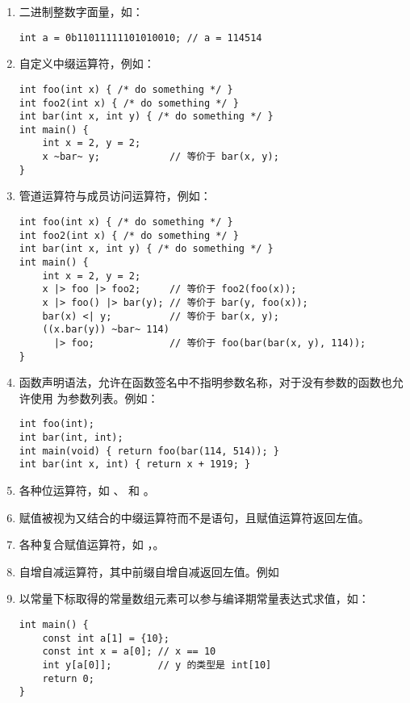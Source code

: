 \begin{enumerate}
    \item 二进制整数字面量，如：
    \begin{verbatim}
int a = 0b11011111101010010; // a = 114514
    \end{verbatim}
    \item 自定义中缀运算符，例如：
    \begin{verbatim}
int foo(int x) { /* do something */ }
int foo2(int x) { /* do something */ }
int bar(int x, int y) { /* do something */ }
int main() {
    int x = 2, y = 2;
    x ~bar~ y;            // 等价于 bar(x, y);
}
    \end{verbatim}
    \item 管道运算符与成员访问运算符，例如：
    \begin{verbatim}
int foo(int x) { /* do something */ }
int foo2(int x) { /* do something */ }
int bar(int x, int y) { /* do something */ }
int main() {
    int x = 2, y = 2;
    x |> foo |> foo2;     // 等价于 foo2(foo(x));
    x |> foo() |> bar(y); // 等价于 bar(y, foo(x));
    bar(x) <| y;          // 等价于 bar(x, y);
    ((x.bar(y)) ~bar~ 114)
      |> foo;             // 等价于 foo(bar(bar(x, y), 114));
}
    \end{verbatim}
    \item 函数声明语法，允许在函数签名中不指明参数名称，对于没有参数的函数也允许使用  为参数列表。例如：
    \begin{verbatim}
int foo(int);
int bar(int, int);
int main(void) { return foo(bar(114, 514)); }
int bar(int x, int) { return x + 1919; }
    \end{verbatim}
    \item 各种位运算符，如 \inlinec{<<}、\inlinec{^} 和 \inlinec{~}。
    \item 赋值被视为又结合的中缀运算符而不是语句，且赋值运算符返回左值。
    \item 各种复合赋值运算符，如 \inlinec{+=}，\inlinec{*=}。
    \item 自增自减运算符，其中前缀自增自减返回左值。例如 
    \item 以常量下标取得的常量数组元素可以参与编译期常量表达式求值，如：
    \begin{verbatim}
int main() {
    const int a[1] = {10};
    const int x = a[0]; // x == 10
    int y[a[0]];        // y 的类型是 int[10]
    return 0;
}
    \end{verbatim}
\end{enumerate}
